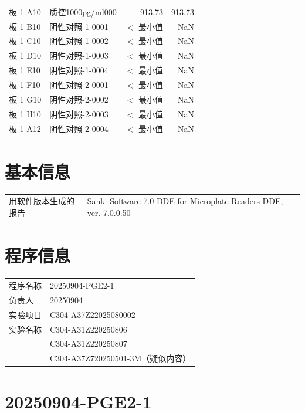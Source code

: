 \documentclass[UTF8,10pt,a4paper,fontset=fandol]{ctexart}
\begin{document}
\begin{tabular}{@{}p{1.7cm}p{4.1cm}r r@{}}
板 1 A10 & 质控1000pg/ml000 & 913.73 & 913.73 \\
板 1 B10 & 阴性对照-1-0001 & $<$ 最小值 & NaN \\
板 1 C10 & 阴性对照-1-0002 & $<$ 最小值 & NaN \\
板 1 D10 & 阴性对照-1-0003 & $<$ 最小值 & NaN \\
板 1 E10 & 阴性对照-1-0004 & $<$ 最小值 & NaN \\
板 1 F10 & 阴性对照-2-0001 & $<$ 最小值 & NaN \\
板 1 G10 & 阴性对照-2-0002 & $<$ 最小值 & NaN \\
板 1 H10 & 阴性对照-2-0003 & $<$ 最小值 & NaN \\
板 1 A12 & 阴性对照-2-0004 & $<$ 最小值 & NaN \\
\end{tabular}
\normalsize

\vspace{1em}

\section*{基本信息}

\begin{tabular}{@{}p{4.2cm}p{10cm}@{}}
用软件版本生成的报告 & Sanki Software 7.0 DDE for Microplate Readers DDE, ver. 7.0.0.50
\end{tabular}

\vspace{1em}

\section*{程序信息}

\begin{tabular}{@{}p{2.5cm}p{11.7cm}@{}}
程序名称 & 20250904-PGE2-1 \\
负责人 & 20250904 \\
实验项目 & C304-A37Z22025080002 \\
实验名称 & C304-A31Z220250806 \\
 & C304-A31Z220250807 \\
 & C304-A37Z720250501-3M（疑似内容） \\
\end{tabular}

\newpage

\section*{20250904-PGE2-1}
\end{document}
